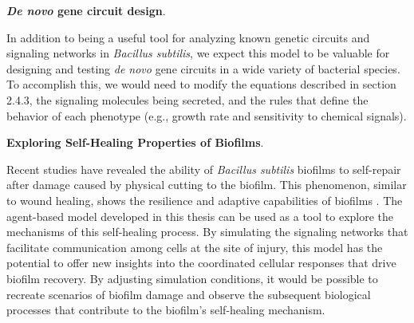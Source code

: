 \textbf{\textit{De novo} gene circuit design}.

In addition to being a useful tool for analyzing known genetic circuits and signaling networks in \textit{Bacillus subtilis}, we expect this model to be valuable for designing and testing \textit{de novo} gene circuits in a wide variety of bacterial species. To accomplish this, we would need to modify the equations described in section 2.4.3, the signaling molecules being secreted, and the rules that define the behavior of each phenotype (e.g., growth rate and sensitivity to chemical signals).

\textbf{Exploring Self-Healing Properties of Biofilms}.

Recent studies have revealed the ability of \textit{Bacillus subtilis} biofilms to self-repair after damage caused by physical cutting to the biofilm. This phenomenon, similar to wound healing, shows the resilience and adaptive capabilities of biofilms {\footnotesize\cite{Wang2021}\cite{Dong2022}\cite{Dong2022_1}}. The agent-based model developed in this thesis can be used as a tool to explore the mechanisms of this self-healing process. By simulating the signaling networks that facilitate communication among cells at the site of injury, this model has the potential to offer new insights into the coordinated cellular responses that drive biofilm recovery. By adjusting simulation conditions, it would be possible to recreate scenarios of biofilm damage and observe the subsequent biological processes that contribute to the biofilm's self-healing mechanism.
